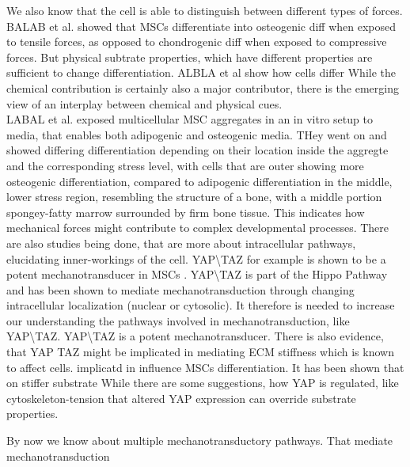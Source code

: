We also know that the cell is able to distinguish between different types of forces. BALAB et al. showed that MSCs differentiate into osteogenic diff when exposed to tensile forces, as opposed to chondrogenic diff when exposed to compressive forces. But physical subtrate properties, which have different properties are sufficient to change differentiation. ALBLA et al show how cells differ While the chemical contribution is certainly also a major contributor, there is the emerging view of an interplay between chemical and physical cues.\\
LABAL et al. exposed multicellular MSC aggregates in an in vitro setup to media, that enables both adipogenic and osteogenic media. THey went on and showed differing differentiation depending on their location inside the aggregte and the corresponding stress level, with cells that are outer showing more osteogenic differentiation, compared to adipogenic differentiation in the middle, lower stress region, resembling the structure of a bone, with a middle portion spongey-fatty marrow surrounded by firm bone tissue. This indicates how mechanical forces might contribute to complex developmental processes.
There are also studies being done, that are more about intracellular pathways, elucidating inner-workings of the cell. YAP\textbackslash{}TAZ for example is shown to be a potent mechanotransducer in MSCs \cite{Halder2012}. YAP\textbackslash{}TAZ is part of the Hippo Pathway and has been shown to mediate mechanotransduction through changing intracellular localization (nuclear or cytosolic).
It therefore is needed to increase our understanding the pathways involved in mechanotransduction, like YAP\textbackslash{}TAZ. YAP\textbackslash{TAZ} is a potent mechanotransducer. There is also evidence, that YAP TAZ might be implicated in mediating ECM stiffness which is known to affect cells. implicatd in influence MSCs differentiation. It has been shown that on stiffer substrate 
While there are some suggestions, how YAP is regulated, like cytoskeleton-tension that altered YAP expression can override substrate properties. 

By now we know about multiple mechanotransductory pathways. That mediate mechanotransduction 

